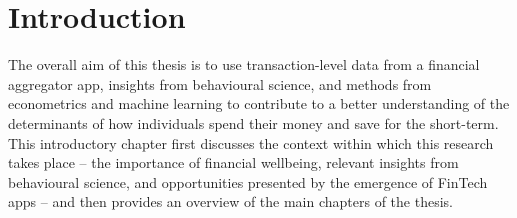 
\chapter{Introduction}%
\label{cha:introduction}

The overall aim of this thesis is to use transaction-level data from a
financial aggregator app, insights from behavioural science, and methods from
econometrics and machine learning to contribute to a better understanding of
the determinants of how individuals spend their money and save for the
short-term. This introductory chapter first discusses the context within which
this research takes place -- the importance of financial wellbeing, relevant
insights from behavioural science, and opportunities presented by the emergence
of FinTech apps -- and then provides an overview of the main chapters of the
thesis.







